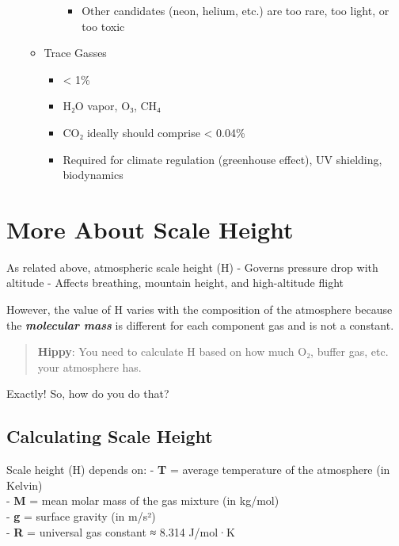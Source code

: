 \documentclass[
  letterpaper,
]{book}
\providecommand{\tightlist}{%
  \setlength{\itemsep}{0pt}\setlength{\parskip}{0pt}}
\begin{document}
\begin{itemize}
\begin{itemize}
\begin{itemize}
      \begin{itemize}
      \tightlist
      \item
        Other candidates (neon, helium, etc.) are too rare, too light,
        or too toxic
      \end{itemize}
    \end{itemize}
  \item
    Trace Gasses

    \begin{itemize}
    \tightlist
    \item
      \textless{} 1\%
    \item
      H₂O vapor, O₃, CH₄
    \item
      CO₂ ideally should comprise \textless{} 0.04\%
    \item
      Required for climate regulation (greenhouse effect), UV shielding,
      biodynamics
    \end{itemize}
  \end{itemize}
\end{itemize}

\section{More About Scale Height}\label{more-about-scale-height}

As related above, atmospheric scale height (H) - Governs pressure drop
with altitude - Affects breathing, mountain height, and high-altitude
flight

However, the value of H varies with the composition of the atmosphere
because the \textbf{\emph{molecular mass}} is different for each
component gas and is not a constant.

\begin{quote}
\textbf{Hippy}: You need to calculate H based on how much O₂, buffer
gas, etc. your atmosphere has.
\end{quote}

Exactly! So, how do you do that?

\subsection{Calculating Scale Height}\label{calculating-scale-height}

Scale height (H) depends on: - \textbf{T} = average temperature of the
atmosphere (in Kelvin)\\
- \textbf{M} = mean molar mass of the gas mixture (in kg/mol)\\
- \textbf{g} = surface gravity (in m/s²)\\
- \textbf{R} = universal gas constant ≈ 8.314 J/mol·K
\end{document}

